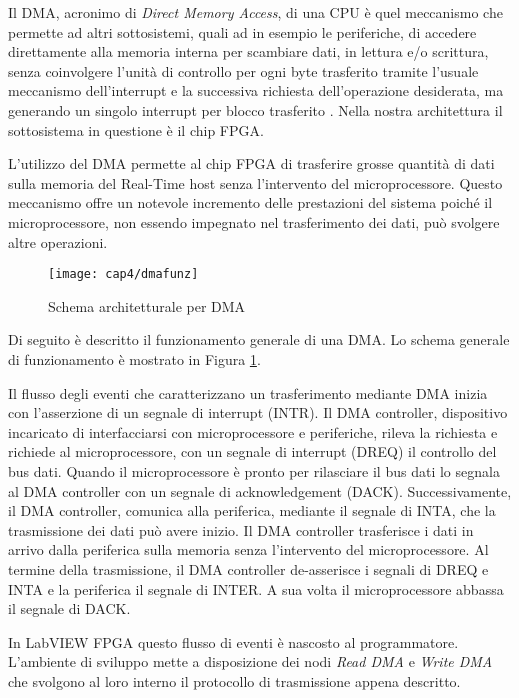 Il DMA, acronimo di \textit{Direct Memory Access}, di una CPU è quel meccanismo che permette ad altri sottosistemi, quali ad in esempio le periferiche, di accedere direttamente alla memoria interna per scambiare dati, in lettura e/o scrittura, senza coinvolgere l'unità di controllo per ogni byte trasferito tramite l'usuale meccanismo dell'interrupt e la successiva richiesta dell'operazione desiderata, ma generando un singolo interrupt per blocco trasferito \cite{tanembaum}. Nella nostra architettura il sottosistema in questione è il chip FPGA.

L'utilizzo del DMA permette al chip FPGA di trasferire grosse quantità di dati sulla memoria del Real-Time host senza l'intervento del microprocessore. Questo meccanismo offre un notevole incremento delle prestazioni del sistema poiché il microprocessore, non essendo impegnato nel trasferimento dei dati, può svolgere altre operazioni.
\begin{figure}  
  \begin{center}
    \texttt{[image: cap4/dmafunz]}
    \caption{Schema architetturale per DMA}
    \label{dmafunz}
  \end{center}
\end{figure} 

Di seguito è descritto il funzionamento generale di una DMA. Lo schema generale di funzionamento è mostrato in Figura \ref{dmafunz}.

Il flusso degli eventi che caratterizzano un trasferimento mediante DMA inizia con l'asserzione di un segnale di interrupt (INTR). Il DMA controller, dispositivo incaricato di interfacciarsi con microprocessore e periferiche, rileva la richiesta e richiede al microprocessore, con un segnale di interrupt (DREQ) il controllo del bus dati. Quando il microprocessore è pronto per rilasciare il bus dati lo segnala al DMA controller con un segnale di acknowledgement (DACK). Successivamente, il DMA controller, comunica alla periferica, mediante il segnale di INTA, che la trasmissione dei dati può avere inizio. Il DMA controller trasferisce i dati in arrivo dalla periferica sulla memoria senza l'intervento del microprocessore. Al termine della trasmissione, il DMA controller de-asserisce i segnali di DREQ e INTA e la periferica il segnale di INTER. A sua volta il microprocessore abbassa il segnale di DACK.

In LabVIEW FPGA questo flusso di eventi è nascosto al programmatore. L'ambiente di sviluppo mette a disposizione dei nodi \textit{Read DMA} e \textit{Write DMA} che svolgono al loro interno il protocollo di trasmissione appena descritto.

